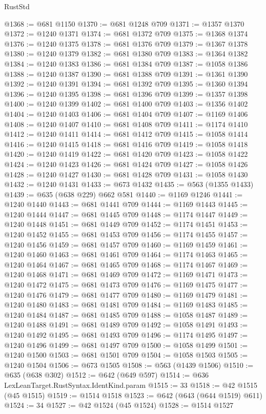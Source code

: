 \begin{lexlean}{RustStd}
\begin{coremodule}
@1368 := @681 @1150
@1370 := @681 @1248 @709
@1371 := @1357 @1370
@1372 := @1240 @1371
@1374 := @681 @1372 @709
@1375 := @1368 @1374
@1376 := @1240 @1375
@1378 := @681 @1376 @709
@1379 := @1367 @1378
@1380 := @1240 @1379
@1382 := @681 @1380 @709
@1383 := @1364 @1382
@1384 := @1240 @1383
@1386 := @681 @1384 @709
@1387 := @1058 @1386
@1388 := @1240 @1387
@1390 := @681 @1388 @709
@1391 := @1361 @1390
@1392 := @1240 @1391
@1394 := @681 @1392 @709
@1395 := @1360 @1394
@1396 := @1240 @1395
@1398 := @681 @1396 @709
@1399 := @1357 @1398
@1400 := @1240 @1399
@1402 := @681 @1400 @709
@1403 := @1356 @1402
@1404 := @1240 @1403
@1406 := @681 @1404 @709
@1407 := @1169 @1406
@1408 := @1240 @1407
@1410 := @681 @1408 @709
@1411 := @1174 @1410
@1412 := @1240 @1411
@1414 := @681 @1412 @709
@1415 := @1058 @1414
@1416 := @1240 @1415
@1418 := @681 @1416 @709
@1419 := @1058 @1418
@1420 := @1240 @1419
@1422 := @681 @1420 @709
@1423 := @1058 @1422
@1424 := @1240 @1423
@1426 := @681 @1424 @709
@1427 := @1058 @1426
@1428 := @1240 @1427
@1430 := @681 @1428 @709
@1431 := @1058 @1430
@1432 := @1240 @1431
@1433 := @673 @1432
@1435 := @563 (@1355 @1433)
@1439 := @635 (@638 @229) @662 @581
@1440 := @1169 @1246
@1441 := @1240 @1440
@1443 := @681 @1441 @709
@1444 := @1169 @1443
@1445 := @1240 @1444
@1447 := @681 @1445 @709
@1448 := @1174 @1447
@1449 := @1240 @1448
@1451 := @681 @1449 @709
@1452 := @1174 @1451
@1453 := @1240 @1452
@1455 := @681 @1453 @709
@1456 := @1174 @1455
@1457 := @1240 @1456
@1459 := @681 @1457 @709
@1460 := @1169 @1459
@1461 := @1240 @1460
@1463 := @681 @1461 @709
@1464 := @1174 @1463
@1465 := @1240 @1464
@1467 := @681 @1465 @709
@1468 := @1174 @1467
@1469 := @1240 @1468
@1471 := @681 @1469 @709
@1472 := @1169 @1471
@1473 := @1240 @1472
@1475 := @681 @1473 @709
@1476 := @1169 @1475
@1477 := @1240 @1476
@1479 := @681 @1477 @709
@1480 := @1169 @1479
@1481 := @1240 @1480
@1483 := @681 @1481 @709
@1484 := @1169 @1483
@1485 := @1240 @1484
@1487 := @681 @1485 @709
@1488 := @1058 @1487
@1489 := @1240 @1488
@1491 := @681 @1489 @709
@1492 := @1058 @1491
@1493 := @1240 @1492
@1495 := @681 @1493 @709
@1496 := @1174 @1495
@1497 := @1240 @1496
@1499 := @681 @1497 @709
@1500 := @1058 @1499
@1501 := @1240 @1500
@1503 := @681 @1501 @709
@1504 := @1058 @1503
@1505 := @1240 @1504
@1506 := @673 @1505
@1508 := @563 (@1439 @1506)
@1510 := @635 (@638 @302)
@1512 := @642 (@649 @597)
@1514 := @636 LexLeanTarget.RustSyntax.IdentKind.param
@1515 := 33
@1518 := @42 @1515 (@45 @1515)
@1519 := @1514 @1518
@1523 := @642 (@643 (@644 @1519) @611)
@1524 := 34
@1527 := @42 @1524 (@45 @1524)
@1528 := @1514 @1527

\end{coremodule}
\end{lexlean}

